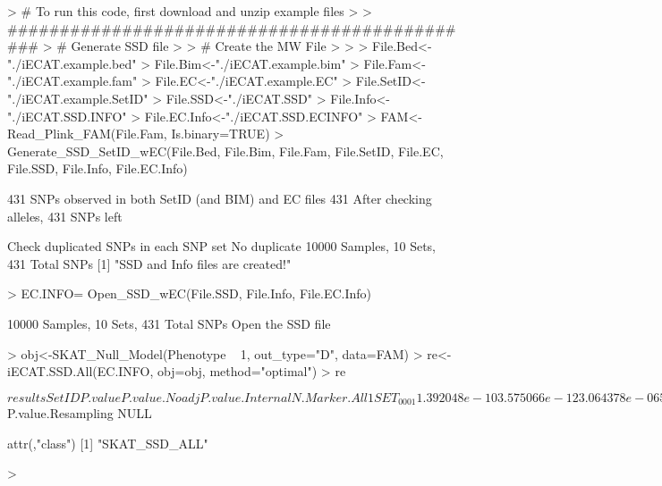\documentclass{article}
\begin{document}
\begin{Schunk}
\begin{Sinput}
> # To run this code, first download and unzip example files
> 
> ##############################################
> # 	Generate SSD file
> 
> # Create the MW File
> 
> 
> File.Bed<-"./iECAT.example.bed"
> File.Bim<-"./iECAT.example.bim"
> File.Fam<-"./iECAT.example.fam"
> File.EC<-"./iECAT.example.EC"
> File.SetID<-"./iECAT.example.SetID"
> File.SSD<-"./iECAT.SSD"
> File.Info<-"./iECAT.SSD.INFO"
> File.EC.Info<-"./iECAT.SSD.ECINFO"
> FAM<-Read_Plink_FAM(File.Fam, Is.binary=TRUE)
> Generate_SSD_SetID_wEC(File.Bed, File.Bim, File.Fam, File.SetID, File.EC, File.SSD, File.Info, File.EC.Info)
\end{Sinput}
\begin{Soutput}
431 SNPs observed in both SetID (and BIM) and EC files
431 After checking alleles, 431  SNPs left

Check duplicated SNPs in each SNP set
No duplicate
10000 Samples, 10 Sets, 431 Total SNPs
[1] "SSD and Info files are created!"
\end{Soutput}
\begin{Sinput}
> EC.INFO= Open_SSD_wEC(File.SSD, File.Info, File.EC.Info)
\end{Sinput}
\begin{Soutput}
10000 Samples, 10 Sets, 431 Total SNPs
Open the SSD file
\end{Soutput}
\begin{Sinput}
> obj<-SKAT_Null_Model(Phenotype ~ 1, out_type="D", data=FAM)
> re<-iECAT.SSD.All(EC.INFO, obj=obj, method="optimal")
> re
\end{Sinput}
\begin{Soutput}
$results
      SetID      P.value P.value.Noadj P.value.Internal N.Marker.All
1  SET_0001 1.392048e-10  3.575066e-12     3.064378e-06           53
2  SET_0002 8.051239e-35  2.462946e-40     2.321727e-20           40
3  SET_0003 6.842589e-03  2.590867e-03     2.427129e-03           38
4  SET_0004 5.549530e-11  1.310897e-11     2.108542e-07           43
5  SET_0005 4.294304e-20  1.988825e-23     1.981221e-13           53
6  SET_0006 3.859261e-05  2.998408e-05     1.138320e-02           42
7  SET_0007 1.845882e-16  6.183193e-28     1.780371e-10           48
8  SET_0008 6.298242e-03  6.099854e-03     3.917145e-02           43
9  SET_0009 1.127014e-18  3.363407e-30     1.366303e-12           41
10 SET_0010 2.248983e-04  2.033899e-05     5.021656e-03           30
   N.Marker.Test
1             53
2             40
3             38
4             43
5             53
6             42
7             48
8             43
9             41
10            30

$P.value.Resampling
NULL

attr(,"class")
[1] "SKAT_SSD_ALL"
\end{Soutput}
\begin{Sinput}
> 
\end{Sinput}
\end{Schunk}
\end{document}
